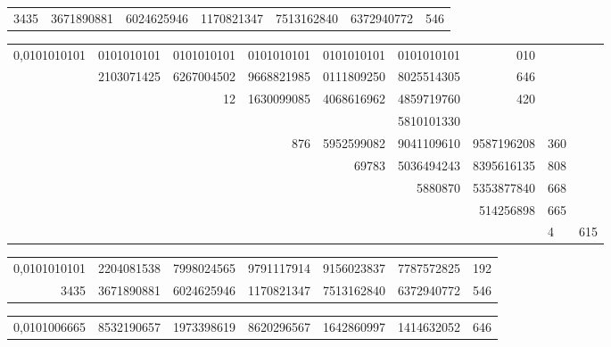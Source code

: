 \documentclass[10pt,a4paper]{article}
\begin{document}
\medskip

\begin{center}
\begin{tabular}{r r r r r r}
3435 & 3671890881 & 6024625946 & 1170821347 & 7513162840 & 6372940772 & 546 \\
\end{tabular}
\end{center}

\medskip

\begin{center}
\begin{tabular}{r r r r r r r}
0,0101010101 & 0101010101 & 0101010101 & 0101010101 & 0101010101 & 0101010101 & 010 \\
& 2103071425 & 6267004502 & 9668821985 & 0111809250 & 8025514305 & 646 \\
& & 12 & 1630099085 & 4068616962 & 4859719760 & 420 \\
& & & & & 5810101330 & \\
& & & 876 & 5952599082 & 9041109610 & 9587196208 & 360 \\
& & & & 69783 & 5036494243 & 8395616135 & 808 \\
& & & & & 5880870 & 5353877840 & 668 \\
& & & & & & 514256898 & 665 \\
& & & & & & & 4 & 615 \\
\end{tabular}
\end{center}

\medskip

\begin{center}
\begin{tabular}{r r r r r r r}
0,0101010101 & 2204081538 & 7998024565 & 9791117914 & 9156023837 & 7787572825 & 192 \\
3435 & 3671890881 & 6024625946 & 1170821347 & 7513162840 & 6372940772 & 546 \\
\end{tabular}
\end{center}

\medskip

\begin{center}
\begin{tabular}{r r r r r r r}
0,0101006665 & 8532190657 & 1973398619 & 8620296567 & 1642860997 & 1414632052 & 646 \\
\end{tabular}
\end{center}

\newpage
\end{document}
